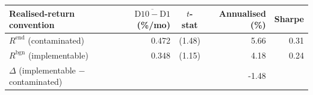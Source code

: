 \begin{tabular}{lrcrr}
\toprule
Realised-return convention & $\overline{\mathrm{D10}{-}\mathrm{D1}}$ (\%/mo) & $t$-stat & Annualised (\%) & Sharpe \\
\midrule
$R^{\text{end}}$ (contaminated) & 0.472 & (1.48) & 5.66 & 0.31 \\
$R^{\text{bgn}}$ (implementable) & 0.348 & (1.15) & 4.18 & 0.24 \\
\midrule
$\Delta$ (implementable $-$ contaminated) & & & -1.48 & 
\\
\bottomrule
\end{tabular}

